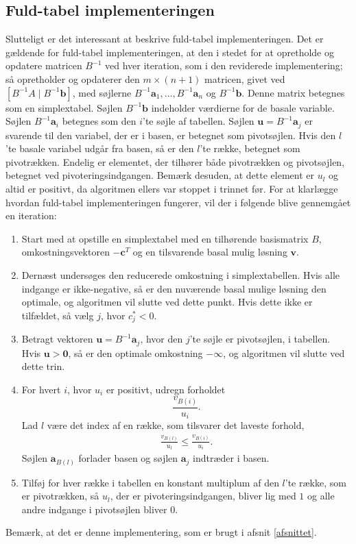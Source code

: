 \subsection{Fuld-tabel implementeringen}
Slutteligt er det interessant at beskrive fuld-tabel implementeringen. 
Det er gældende for fuld-tabel implementeringen, at den i stedet for at opretholde og opdatere matricen $B^{-1}$ ved hver iteration, som i den reviderede implementering; 
så opretholder og opdaterer den $m \times (n+1)$ matricen, givet ved $\left [ B^{-1} A \mid B^{-1} \mathbf{b} \right ]$, med søjlerne $B^{-1}\mathbf{a}_1,\ldots,B^{-1}\mathbf{a}_n$ og $B^{-1}\mathbf{b}$. 
Denne matrix betegnes som en simplextabel.
Søjlen $B^{-1}\mathbf{b}$ indeholder værdierne for de basale variable.
Søjlen $B^{-1}\mathbf{a}_i$ betegnes som den $i$'te søjle af tabellen.
Søjlen $\mathbf{u} = B^{-1}\mathbf{a}_j$ er svarende til den variabel, der er i basen, er betegnet som pivotsøjlen. 
Hvis den $l$'te basale variabel udgår fra basen, så er den $l$'te række, betegnet som pivotrækken.
Endelig er elementet, der tilhører både pivotrækken og pivotsøjlen, betegnet ved pivoteringsindgangen.
Bemærk desuden, at dette element er $u_l$ og altid er positivt, da algoritmen ellers var stoppet i trinnet før. 
For at klarlægge hvordan fuld-tabel implementeringen fungerer, vil der i følgende blive gennemgået en iteration: 
%
\begin{tcolorbox}[
title=Fuld-tabel implementering,
colback		= myblue!15,
colframe	= myblue!15,
coltitle	= black,
before skip	= 20pt plus 2pt,
after skip	= 20pt plus 2pt,
fonttitle	= \bfseries]
\begin{enumerate}
\item Start med at opstille en simplextabel med en tilhørende  basismatrix $B$, omkostningsvektoren $-\textbf{c}^T$ og en tilsvarende basal mulig løsning $\mathbf{v}.$
\item Dernæst undersøges den reducerede omkostning i simplextabellen.
Hvis alle indgange er ikke-negative, så er den nuværende basal mulige løsning den optimale, og algoritmen vil slutte ved dette punkt.
Hvis dette ikke er tilfældet, så vælg $j$, hvor $c_j^* < 0$.
\item Betragt vektoren $\mathbf{u}=B^{-1}\mathbf{a}_j$, hvor den $j$'te søjle er pivotsøjlen, i tabellen.
Hvis $\mathbf{u} > \textbf{0}$, så er den optimale omkostning $-\infty$, og algoritmen vil slutte ved dette trin. 
\item For hvert $i$, hvor $u_i$ er positivt, udregn forholdet $$\frac{v_{B(i)}}{u_i}.$$ 
Lad $l$ være det index af en række, som tilsvarer det laveste forhold,
\begin{align*}
\frac{v_{B(l)}}{u_l} \leq \frac{v_{B(i)}}{u_i}.
\end{align*}
Søjlen $\mathbf{a}_{B(l)}$ forlader basen og søjlen $\mathbf{a}_j$ indtræder i basen. 
\item Tilføj for hver række i tabellen en konstant multiplum af den $l$'te række, som er pivotrækken, så $u_l$, der er pivoteringsindgangen, bliver lig med $1$ og alle andre indgange i pivotsøjlen bliver $0$. 
\end{enumerate}
\end{tcolorbox}
\noindent
%
Bemærk, at det er denne implementering, som er brugt i afsnit \ref{afsnittet}.